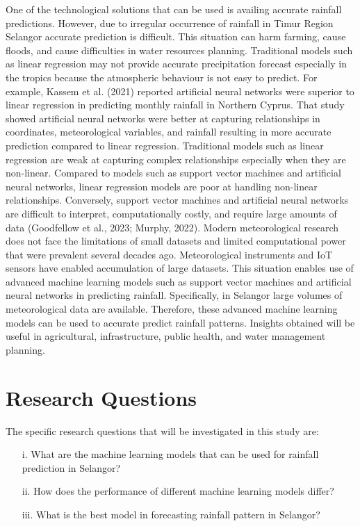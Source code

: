 \documentclass[12pt]{article}
\begin{document}
One of the technological solutions that can be used is availing accurate rainfall predictions. However, due to irregular occurrence of rainfall in Timur Region Selangor accurate prediction is difficult. This situation can harm farming, cause floods, and cause difficulties in water resources planning. Traditional models such as linear regression may not provide accurate precipitation forecast especially in the tropics because the atmospheric behaviour is not easy to predict. For example, Kassem et al. (2021) reported artificial neural networks were superior to linear regression in predicting monthly rainfall in Northern Cyprus. That study showed artificial neural networks were better at capturing relationships in coordinates, meteorological variables, and rainfall resulting in more accurate prediction compared to linear regression. Traditional models such as linear regression are weak at capturing complex relationships especially when they are non-linear. Compared to models such as support vector machines and artificial neural networks, linear regression models are poor at handling non-linear relationships. Conversely, support vector machines and artificial neural networks are difficult to interpret, computationally costly, and require large amounts of data (Goodfellow et al., 2023; Murphy, 2022). Modern meteorological research does not face the limitations of small datasets and limited computational power that were prevalent several decades ago. Meteorological instruments and IoT sensors have enabled accumulation of large datasets. This situation enables use of advanced machine learning models such as support vector machines and artificial neural networks in predicting rainfall. Specifically, in Selangor large volumes of meteorological data are available. Therefore, these advanced machine learning models can be used to accurate predict rainfall patterns. Insights obtained will be useful in agricultural, infrastructure, public health, and water management planning.

\section{Research Questions}
\label{sec:research_questions}
The specific research questions that will be investigated in this study are:
\begin{itemize}
    \item[i.] What are the machine learning models that can be used for rainfall prediction in Selangor?
    \item[ii.] How does the performance of different machine learning models differ?
    \item[iii.] What is the best model in forecasting rainfall pattern in Selangor?
\end{itemize}
\end{document}
